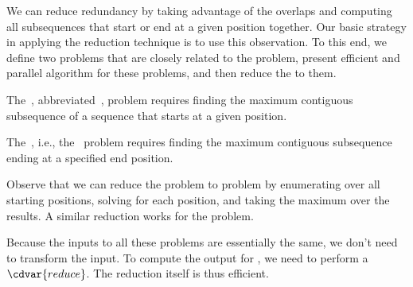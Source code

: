 \begin{cluster}
\label{grp:grm:mcss::reducing-redundancy}

\begin{gram}
\label{grm:mcss::reducing-redundancy}
We can reduce redundancy by taking advantage of the overlaps and
computing all subsequences that start or end at a given position
together.
Our basic strategy in applying the reduction technique is to use this
observation.
To this end, we define two problems that are closely related to the
\MCSS{} problem, present efficient and parallel algorithm for these
problems, and then reduce the \MCSS{} to them.

\end{gram}
\end{cluster}

\begin{cluster}
\label{grp:def:mcss::maximum}

\begin{definition}[\MCSSS{}]
\label{def:mcss::maximum}
The~,
abbreviated~, problem requires finding the maximum
contiguous subsequence of a sequence that starts at a given position.

\end{definition}
\end{cluster}

\begin{cluster}
\label{grp:def:mcss::problem}

\begin{definition}
\label{def:mcss::problem}
The~, i.e.,
the~ problem requires finding the maximum contiguous
subsequence ending at a specified end position.

\end{definition}
\end{cluster}

\begin{cluster}
\label{grp:grm:mcss::reducing-to-and}

\begin{gram}
\label{grm:mcss::reducing-to-and}
Observe that we can reduce the \MCSS{} problem to \MCSSS{} problem by
enumerating over all starting positions, solving \MCSSS{} for each
position, and taking the maximum over the results.
A similar reduction works for the \MCSSE{} problem.

Because the inputs to all these problems are essentially the same, we
don't need to transform the input.  To compute the output for \MCSS{},
we need to perform a $\cdvar{reduce}$.
The reduction itself is thus efficient.

\end{gram}
\end{cluster}

